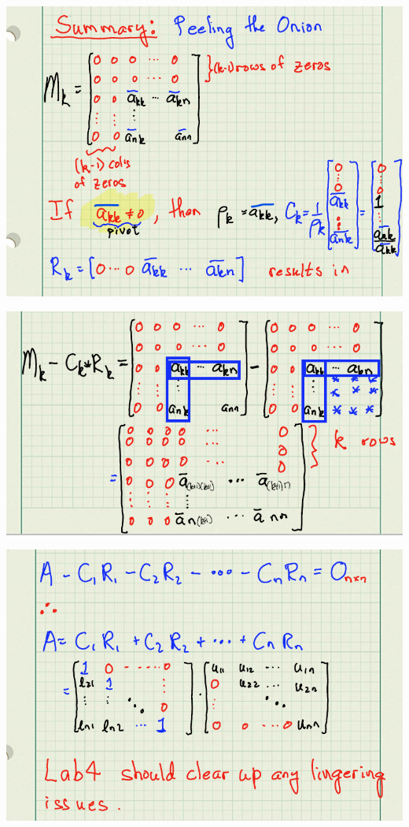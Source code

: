 \begin{center}

\includegraphics[width=0.9\columnwidth]{graphics/Summary/PeelingTheOnionPart01.png}

\includegraphics[width=0.9\columnwidth]{graphics/Summary/PeelingTheOnionPart02.png}

\includegraphics[width=0.9\columnwidth]{graphics/Summary/PeelingTheOnionPart03b.png}

\end{center}
 
